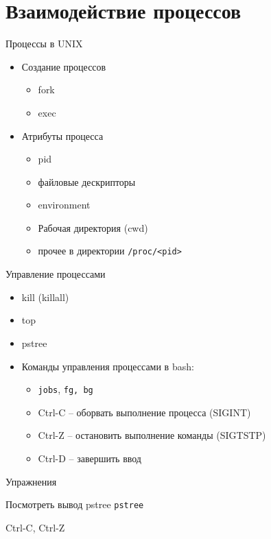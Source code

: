 \documentclass[ignorenonframetext, professionalfonts, hyperref={pdftex, unicode}]{beamer}
\begin{document}
\section{Взаимодействие процессов}
\begin{frame}{Процессы в UNIX}
\begin{itemize}
  \item Создание процессов
   \begin{itemize}
      \item fork
       \item exec
   \end{itemize}
\item Атрибуты процесса
  \begin{itemize}
   \item pid 
   \item файловые дескрипторы
   \item environment
   \item Рабочая директория (cwd)
   \item прочее в директории {\tt /proc/<pid>}
  \end{itemize}
\end{itemize}
\begin{frame}{Управление процессами}
\begin{itemize}
        \item kill (killall)
        \item top
        \item pstree
	\item Команды управления процессами в bash: 
	  \begin{itemize}
                \item {\tt jobs}, {\tt fg, \tt bg}
		\item Ctrl-C -- оборвать выполнение процесса (SIGINT)
		\item Ctrl-Z -- остановить выполнение команды (SIGTSTP)
		\item Ctrl-D -- завершить ввод
	  \end{itemize}
\end{itemize}
\end{frame}
\begin{frame}{Упражнения}
\begin{block}{Посмотреть вывод pstree}
{\tt pstree}
\end{block}
\pause
\begin{block}{Ctrl-C, Ctrl-Z}
\end{block}
\pause
\begin{block}{fork bomb}
{\tt ulimit -u 200}
{\tt bomb(){ (bomb; bomb) \& }
top
killall bash
\end{block}
\end{frame}


\end{frame}
\end{document}
